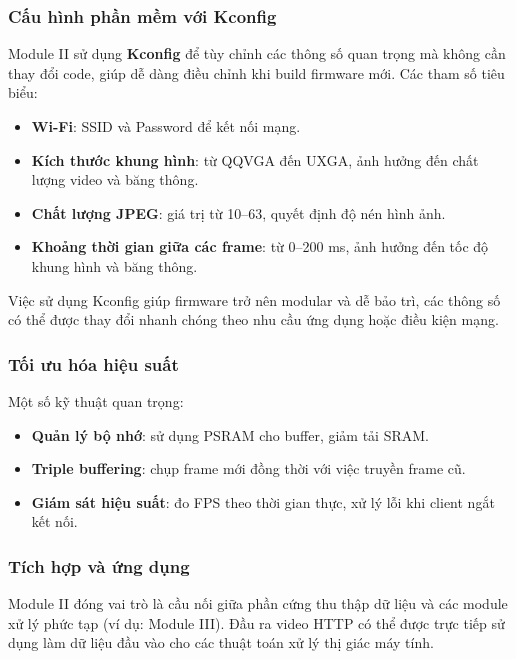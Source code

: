\subsubsection{Cấu hình phần mềm với Kconfig}
Module II sử dụng \textbf{Kconfig} để tùy chỉnh các thông số quan trọng mà không cần thay đổi code, giúp dễ dàng điều chỉnh khi build firmware mới. Các tham số tiêu biểu:

\begin{itemize}
    \item \textbf{Wi-Fi}: SSID và Password để kết nối mạng.
    \item \textbf{Kích thước khung hình}: từ QQVGA đến UXGA, ảnh hưởng đến chất lượng video và băng thông.
    \item \textbf{Chất lượng JPEG}: giá trị từ 10–63, quyết định độ nén hình ảnh.
    \item \textbf{Khoảng thời gian giữa các frame}: từ 0–200 ms, ảnh hưởng đến tốc độ khung hình và băng thông.
\end{itemize}

Việc sử dụng Kconfig giúp firmware trở nên modular và dễ bảo trì, các thông số có thể được thay đổi nhanh chóng theo nhu cầu ứng dụng hoặc điều kiện mạng.

\subsubsection{Tối ưu hóa hiệu suất}
Một số kỹ thuật quan trọng:

\begin{itemize}
    \item \textbf{Quản lý bộ nhớ}: sử dụng PSRAM cho buffer, giảm tải SRAM.
    \item \textbf{Triple buffering}: chụp frame mới đồng thời với việc truyền frame cũ.
    \item \textbf{Giám sát hiệu suất}: đo FPS theo thời gian thực, xử lý lỗi khi client ngắt kết nối.
\end{itemize}

\subsubsection{Tích hợp và ứng dụng}
Module II đóng vai trò là cầu nối giữa phần cứng thu thập dữ liệu và các module xử lý phức tạp (ví dụ: Module III). Đầu ra video HTTP có thể được trực tiếp sử dụng làm dữ liệu đầu vào cho các thuật toán xử lý thị giác máy tính.


